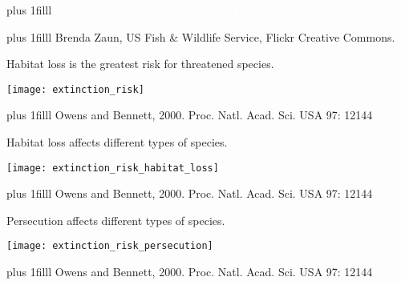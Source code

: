 \documentclass[t]{beamer}
\newcommand\imagecredit[1]{%
	\vskip0pt plus 1filll \tiny #1}%
\begin{document}
{
\begin{frame}[t,plain]{}
	\imagecredit{\hfill\textcolor{white}{Norman Kaleomokuokanalu Chock, Flickr Creative Commons.}}
\end{frame}
}

{
\begin{frame}[t,plain]{}
	\imagecredit{\hfill Brenda Zaun, US Fish \& Wildlife Service, Flickr Creative Commons.}
\end{frame}
}

{
\begin{frame}[t,plain]{Habitat loss is the greatest risk for threatened species.}
	\begin{center}
		\texttt{[image: extinction\_risk]}
	\end{center}
	\imagecredit{\hfill Owens and Bennett, 2000. Proc. Natl. Acad. Sci. USA 97: 12144}
\end{frame}
}

{
\begin{frame}[t,plain]{Habitat loss affects different types of species.}
	\begin{center}
		\texttt{[image: extinction\_risk\_habitat\_loss]}
	\end{center}

	\imagecredit{\hfill Owens and Bennett, 2000. Proc. Natl. Acad. Sci. USA 97: 12144}
\end{frame}
}

{
\begin{frame}[t,plain]{Persecution affects different types of species.}
	\begin{center}
		\texttt{[image: extinction\_risk\_persecution]}
	\end{center}
	\imagecredit{\hfill Owens and Bennett, 2000. Proc. Natl. Acad. Sci. USA 97: 12144}
\end{frame}
}
\end{document}
